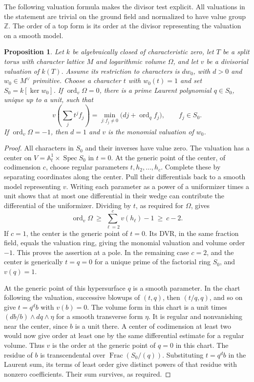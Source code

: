 \documentclass[11pt,reqno]{amsart}
\numberwithin{equation}{section}
\newtheorem{proposition}[theorem]{Proposition}
\theoremstyle{definition}
\theoremstyle{remark}
\DeclareMathOperator{\Spec}{Spec}
\DeclareMathOperator{\Frac}{Frac}
\DeclareMathOperator{\ord}{ord}
\begin{document}
The following valuation formula makes the divisor test explicit.
All valuations in the statement are trivial on the ground field and
normalized to have value group \(\mathbb Z\). The order of a top form
is its order at the divisor representing the valuation on a smooth model.

\begin{proposition}\label{prop:divisorial-order}
Let \(k\) be algebraically closed of characteristic zero, let \(T\) be
a split torus with character lattice \(M\) and logarithmic volume
\(\Omega\), and let \(v\) be a divisorial valuation of \(k(T)\).
Assume its restriction to characters is \(d w_0\), with \(d>0\) and
\(w_0\in M^\vee\) primitive. Choose a character \(t\) with \(w_0(t)=1\)
and set \(S_0=k[\ker w_0]\).
If \(\ord _v\Omega=0\), there is a prime Laurent polynomial
\(q\in S_0\), unique up to a unit, such that
\[ v\!\left(\sum_jt^j f_j\right) =\min_{j:f_j\ne0}\bigl(dj+\ord _q f_j\bigr), \qquad f_j\in S_0. \]
If \(\ord _v\Omega=-1\), then \(d=1\) and \(v\) is the
monomial valuation of \(w_0\).
\end{proposition}
\begin{proof}
All characters in \(S_0\) and their inverses have value zero.
The valuation has a center on
\(V=\mathbb A^1_t\times\Spec S_0\) in \(t=0\).
At the generic point of the center, of codimension \(c\), choose
regular parameters \(t,h_2,\ldots,h_c\). Complete these by separating
coordinates along the center. Pull their differentials back to a
smooth model representing \(v\). Writing each parameter as a power
of a uniformizer times a unit shows that at most one differential in
their wedge can contribute the differential of the uniformizer.
Dividing by \(t\), as required for \(\Omega\), gives
\[ \ord _v\Omega\ \ge\ \sum_{\ell=2}^c v(h_\ell)-1\ \ge\ c-2 . \]
If \(c=1\), the center is the generic point of \(t=0\). Its DVR, in
the same fraction field, equals the valuation ring, giving the
monomial valuation and volume order \(-1\). This proves the assertion
at a pole. In the remaining case \(c=2\), and the center is generically
\(t=q=0\) for a unique prime of the factorial ring \(S_0\), and
\(v(q)=1\).

At the generic point of this hypersurface \(q\) is a smooth parameter.
In the chart following the valuation, successive blowups of
\((t,q)\), then \((t/q,q)\), and so on give \(t=q^d b\) with \(v(b)=0\).
The volume form in this chart is a unit times
\((db/b)\wedge dq\wedge\eta\) for a smooth transverse form \(\eta\).
It is regular and nonvanishing near the center, since \(b\) is a
unit there. A center of codimension at least two would now give order
at least one by the same differential estimate for a regular volume.
Thus \(v\) is the order at the generic point of \(q=0\) in this chart.
The residue of \(b\) is transcendental over
\(\Frac (S_0/(q))\). Substituting \(t=q^d b\) in the
Laurent sum, its terms of least order give distinct powers of that
residue with nonzero coefficients. Their sum survives, as required.
\end{proof}
\end{document}
